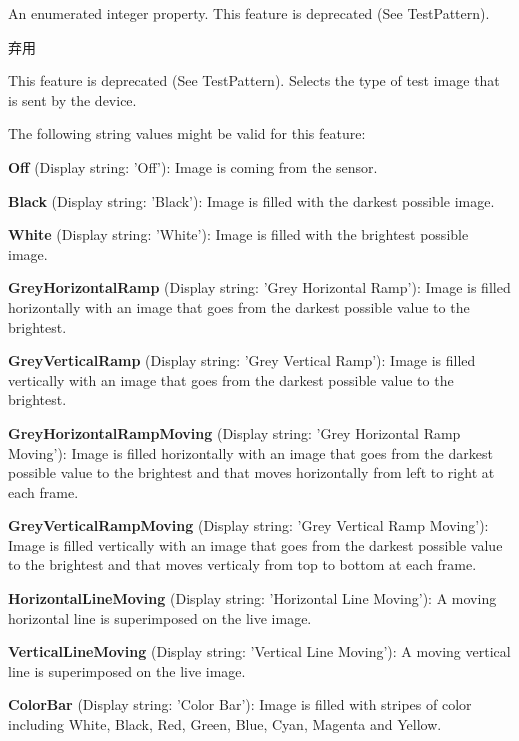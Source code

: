 An enumerated integer property. This feature is deprecated (See Test\+Pattern). 

\begin{DoxyRefDesc}{弃用}
\item[\hyperlink{deprecated__deprecated000042}{弃用}]This feature is deprecated (See Test\+Pattern). Selects the type of test image that is sent by the device.\end{DoxyRefDesc}


The following string values might be valid for this feature\+:
\begin{DoxyItemize}
\item {\bfseries Off} (Display string\+: 'Off')\+: Image is coming from the sensor.
\item {\bfseries Black} (Display string\+: 'Black')\+: Image is filled with the darkest possible image.
\item {\bfseries White} (Display string\+: 'White')\+: Image is filled with the brightest possible image.
\item {\bfseries Grey\+Horizontal\+Ramp} (Display string\+: 'Grey Horizontal Ramp')\+: Image is filled horizontally with an image that goes from the darkest possible value to the brightest.
\item {\bfseries Grey\+Vertical\+Ramp} (Display string\+: 'Grey Vertical Ramp')\+: Image is filled vertically with an image that goes from the darkest possible value to the brightest.
\item {\bfseries Grey\+Horizontal\+Ramp\+Moving} (Display string\+: 'Grey Horizontal Ramp Moving')\+: Image is filled horizontally with an image that goes from the darkest possible value to the brightest and that moves horizontally from left to right at each frame.
\item {\bfseries Grey\+Vertical\+Ramp\+Moving} (Display string\+: 'Grey Vertical Ramp Moving')\+: Image is filled vertically with an image that goes from the darkest possible value to the brightest and that moves verticaly from top to bottom at each frame.
\item {\bfseries Horizontal\+Line\+Moving} (Display string\+: 'Horizontal Line Moving')\+: A moving horizontal line is superimposed on the live image.
\item {\bfseries Vertical\+Line\+Moving} (Display string\+: 'Vertical Line Moving')\+: A moving vertical line is superimposed on the live image.
\item {\bfseries Color\+Bar} (Display string\+: 'Color Bar')\+: Image is filled with stripes of color including White, Black, Red, Green, Blue, Cyan, Magenta and Yellow.

\end{DoxyItemize}
